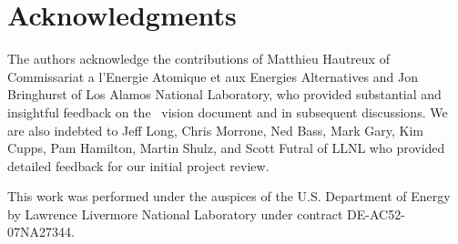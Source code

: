 \section {Acknowledgments}
The authors acknowledge the contributions of Matthieu Hautreux
of Commissariat a l'Energie Atomique et aux Energies Alternatives
and Jon Bringhurst of Los Alamos National Laboratory, who provided
substantial and insightful feedback on the \flux\ vision document
and in subsequent discussions.
We are also indebted to 
Jeff Long, Chris Morrone, Ned Bass,
Mark Gary, Kim Cupps, Pam Hamilton, Martin Shulz, and Scott Futral
of LLNL who provided detailed feedback for our initial project review.
\ifcomments
{}
\fi

This work was performed under the auspices of the U.S. Department
of Energy by Lawrence Livermore National Laboratory under
contract DE-AC52-07NA27344.
